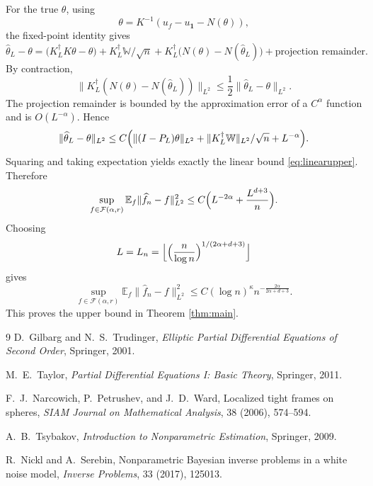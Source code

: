 \documentclass[11pt]{article}
\newcommand{\E}{\mathbb{E}}
\newcommand{\1}{\mathbf{1}}
\begin{document}
For the true $\theta$, using
\[
\theta=K^{-1}(u_f-u_{\1}-N(\theta)),
\]
the fixed-point identity gives
\[
\widehat\theta_L-\theta
=
\bigl(K_L^\dagger K\theta-\theta\bigr)
+
K_L^\dagger\mathbb W/\sqrt n
+
K_L^\dagger\bigl(N(\theta)-N(\widehat\theta_L)\bigr)
+
\text{projection remainder}.
\]
By contraction,
\[
\|K_L^\dagger(N(\theta)-N(\widehat\theta_L))\|_{L^2}
\le
\frac12\|\widehat\theta_L-\theta\|_{L^2}.
\]
The projection remainder is bounded by the approximation error of a $C^\alpha$ function and is $O(L^{-\alpha})$. Hence
\[
\|\widehat\theta_L-\theta\|_{L^2}
\le
C\Bigl(
\|(I-P_L)\theta\|_{L^2}
+
\|K_L^\dagger\mathbb W\|_{L^2}/\sqrt n
+
L^{-\alpha}
\Bigr).
\]
Squaring and taking expectation yields exactly the linear bound \eqref{eq:linearupper}. Therefore
\[
\sup_{f\in\mathcal F(\alpha,r)}
\E_f\|\widehat f_n-f\|_{L^2}^2
\le
C\Bigl(L^{-2\alpha}+\frac{L^{d+3}}n\Bigr).
\]
Choosing
\[
L=L_n
=
\Bigl\lfloor
\Bigl(\frac n{\log n}\Bigr)^{1/(2\alpha+d+3)}
\Bigr\rfloor
\]
gives
\[
\sup_{f\in\mathcal F(\alpha,r)}
\E_f\|\widehat f_n-f\|_{L^2}^2
\le
C(\log n)^\kappa n^{-\frac{2\alpha}{2\alpha+d+3}}.
\]
This proves the upper bound in Theorem \ref{thm:main}.

\begin{thebibliography}{9}
D.~Gilbarg and N.~S.~Trudinger,
\textit{Elliptic Partial Differential Equations of Second Order},
Springer, 2001.

M.~E.~Taylor,
\textit{Partial Differential Equations I: Basic Theory},
Springer, 2011.

F.~J.~Narcowich, P.~Petrushev, and J.~D.~Ward,
Localized tight frames on spheres,
\textit{SIAM Journal on Mathematical Analysis}, 38 (2006), 574--594.

A.~B.~Tsybakov,
\textit{Introduction to Nonparametric Estimation},
Springer, 2009.

R.~Nickl and A.~Serebin,
Nonparametric Bayesian inverse problems in a white noise model,
\textit{Inverse Problems}, 33 (2017), 125013.
\end{thebibliography}
\end{document}
